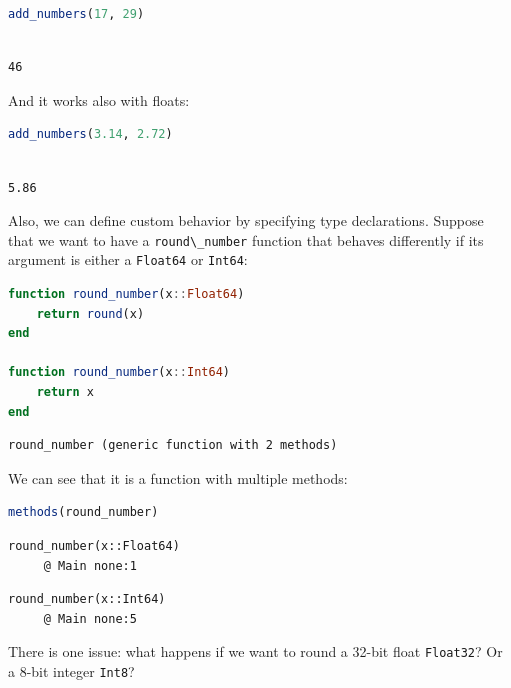 \documentclass[
  notoc %
]{tufte-book}
\newcommand{\passthrough}[1]{#1}
\begin{document}
\begin{lstlisting}[language=Julia]
add_numbers(17, 29)
\end{lstlisting}

\begin{lstlisting}[language=Output]

46

\end{lstlisting}

And it works also with floats:

\begin{lstlisting}[language=Julia]
add_numbers(3.14, 2.72)
\end{lstlisting}

\begin{lstlisting}[language=Output]

5.86

\end{lstlisting}

Also, we can define custom behavior by specifying type declarations.
Suppose that we want to have a \passthrough{\lstinline!round\_number!}
function that behaves differently if its argument is either a
\passthrough{\lstinline!Float64!} or \passthrough{\lstinline!Int64!}:

\begin{lstlisting}[language=Julia]
function round_number(x::Float64)
    return round(x)
end

function round_number(x::Int64)
    return x
end
\end{lstlisting}

\begin{lstlisting}[language=Output]
round_number (generic function with 2 methods)
\end{lstlisting}

We can see that it is a function with multiple methods:

\begin{lstlisting}[language=Julia]
methods(round_number)
\end{lstlisting}

\begin{lstlisting}[language=Output]
round_number(x::Float64)
     @ Main none:1
\end{lstlisting}

\begin{lstlisting}[language=Output]
round_number(x::Int64)
     @ Main none:5
\end{lstlisting}

There is one issue: what happens if we want to round a 32-bit float
\passthrough{\lstinline!Float32!}? Or a 8-bit integer
\passthrough{\lstinline!Int8!}?
\end{document}
